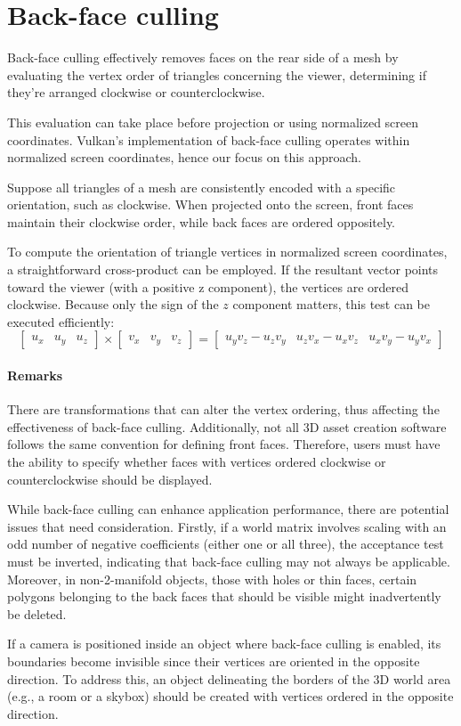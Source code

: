 \section{Back-face culling}

Back-face culling effectively removes faces on the rear side of a mesh by evaluating the vertex order of triangles concerning the viewer, determining if they're arranged clockwise or counterclockwise.

This evaluation can take place before projection or using normalized screen coordinates.
Vulkan's implementation of back-face culling operates within normalized screen coordinates, hence our focus on this approach.

Suppose all triangles of a mesh are consistently encoded with a specific orientation, such as clockwise.
When projected onto the screen, front faces maintain their clockwise order, while back faces are ordered oppositely.

To compute the orientation of triangle vertices in normalized screen coordinates, a straightforward cross-product can be employed.
If the resultant vector points toward the viewer (with a positive z component), the vertices are ordered clockwise. 
Because only the sign of the $z$ component matters, this test can be executed efficiently:
\[\begin{bmatrix}
    u_x & u_y & u_z
\end{bmatrix} \times \begin{bmatrix}
    v_x & v_y & v_z
\end{bmatrix}=\begin{bmatrix}
    u_yv_z - u_zv_y & u_zv_x - u_xv_z & u_xv_y -u_yv_x
\end{bmatrix}\]

\paragraph*{Remarks}
There are transformations that can alter the vertex ordering, thus affecting the effectiveness of back-face culling. 
Additionally, not all 3D asset creation software follows the same convention for defining front faces. 
Therefore, users must have the ability to specify whether faces with vertices ordered clockwise or counterclockwise should be displayed.

While back-face culling can enhance application performance, there are potential issues that need consideration. 
Firstly, if a world matrix involves scaling with an odd number of negative coefficients (either one or all three), the acceptance test must be inverted, indicating that back-face culling may not always be applicable. 
Moreover, in non-2-manifold objects, those with holes or thin faces, certain polygons belonging to the back faces that should be visible might inadvertently be deleted.

If a camera is positioned inside an object where back-face culling is enabled, its boundaries become invisible since their vertices are oriented in the opposite direction. 
To address this, an object delineating the borders of the 3D world area (e.g., a room or a skybox) should be created with vertices ordered in the opposite direction.